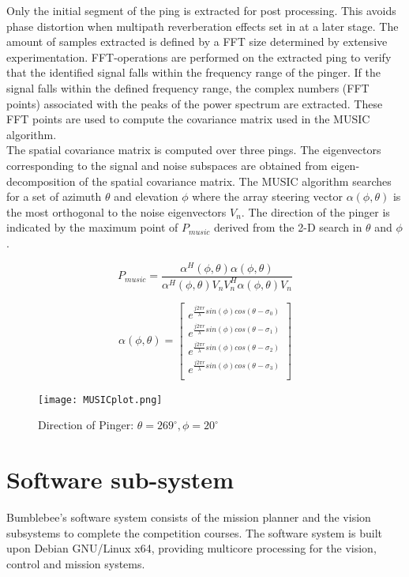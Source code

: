 \documentclass[journal,12pt]{IEEEtran}
\begin{document}
Only the initial segment of the ping is extracted for post processing. This avoids phase distortion when multipath reverberation effects set in at a later stage. The amount of samples extracted is defined by a FFT size  determined by extensive experimentation. FFT-operations are performed on the extracted ping to verify that the identified signal falls within the frequency range of the pinger. If the signal falls within the defined frequency range, the complex numbers (FFT points) associated with the peaks of the power spectrum are extracted. These FFT points are used to compute the covariance matrix used in the MUSIC algorithm. \\

The spatial covariance matrix is computed over three pings. The eigenvectors corresponding to the signal and noise subspaces are obtained from eigen-decomposition of the spatial covariance matrix. The MUSIC algorithm searches for a set of azimuth $\theta$ and elevation $\phi$ where the array steering vector $\alpha(\phi,\theta)$ is the most orthogonal to the noise eigenvectors $V_n$. The direction of the pinger is indicated by the maximum point of $P_{music}$ derived from the 2-D search in $\theta$ and $\phi$.

\begin{equation} 
P_{music} = \frac{\alpha^H(\phi,\theta)\alpha(\phi,\theta)}{\alpha^H(\phi,\theta)V_nV_n^H\alpha(\phi,\theta)V_n} 
\end{equation}

\begin{equation}
\alpha(\phi,\theta) = \begin{bmatrix}
e^{\frac{j2 \pi r} {\lambda} sin(\phi)cos(\theta-\sigma_{0})}\\
e^{\frac{j2 \pi r} {\lambda} sin(\phi)cos(\theta-\sigma_{1})}\\
e^{\frac{j2 \pi r} {\lambda} sin(\phi)cos(\theta-\sigma_{2})}\\
e^{\frac{j2 \pi r} {\lambda} sin(\phi)cos(\theta-\sigma_{3})}\\
\end{bmatrix}
\end{equation}

\begin{figure}[h]
\centering
\texttt{[image: MUSICplot.png]}
\captionsetup{justification=centering}
\caption{Direction of Pinger: $\theta=269^\circ,\phi=20^{\circ}$ }
\end{figure}

\section{Software sub-system}
Bumblebee's software system consists of the mission planner and the vision subsystems to complete the competition courses. The software system is built upon Debian GNU/Linux x64, providing multicore processing for the vision, control and mission systems. \\
\end{document}
